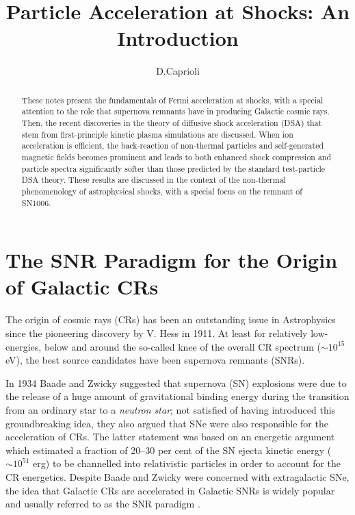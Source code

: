 \documentclass[varenna]{cimento}
\title{Particle Acceleration at Shocks: An Introduction}
\author{D.Caprioli}
\institute{Department of Astronomy \& Astrophysics and
E. Fermi Institute\\ The University of Chicago, 5640 S Ellis Ave, Chicago, IL 60637, USA}
\begin{document}
\maketitle

\begin{abstract}
These notes present the fundamentals of Fermi acceleration at shocks, with a special attention to the role that supernova remnants have in producing Galactic cosmic rays.
Then, the recent discoveries in the theory of diffusive shock acceleration (DSA) that stem from first-principle kinetic plasma simulations are discussed.
When ion acceleration is efficient, the back-reaction of non-thermal particles and self-generated magnetic fields becomes prominent and leads to both enhanced shock compression and particle spectra significantly softer than those predicted by the standard test-particle DSA theory. 
These results are discussed in the context of the non-thermal phenomenology of astrophysical shocks, with a special focus on the remnant of SN1006.
\end{abstract}

\section{The SNR Paradigm for the Origin of Galactic CRs}
The origin of cosmic rays (CRs) has been an outstanding issue in Astrophysics since the pioneering discovery by V. Hess in 1911. 
At least for relatively low-energies, below and around the so-called knee of the overall CR spectrum ($\sim 10^{15}$ eV), the best source candidates have been supernova remnants (SNRs).

In 1934 Baade and Zwicky  \cite{baade+34} suggested that supernova (SN) explosions were due to the release of a huge amount of gravitational binding energy during the transition from an ordinary star to a \emph{neutron star};
not satisfied of having introduced this groundbreaking idea, they also argued that SNe were also responsible for the acceleration of CRs.
The latter statement was based on an energetic argument which estimated a fraction of 20--30 per cent of the SN ejecta kinetic energy ($\sim 10^{51}$ erg) to be channelled into relativistic particles in order to account for the CR energetics.
Despite Baade and Zwicky were concerned with extragalactic SNe, the idea that Galactic CRs are accelerated in Galactic SNRs is widely popular and usually referred to as the SNR paradigm 
\cite{hillas05}.
\end{document}
